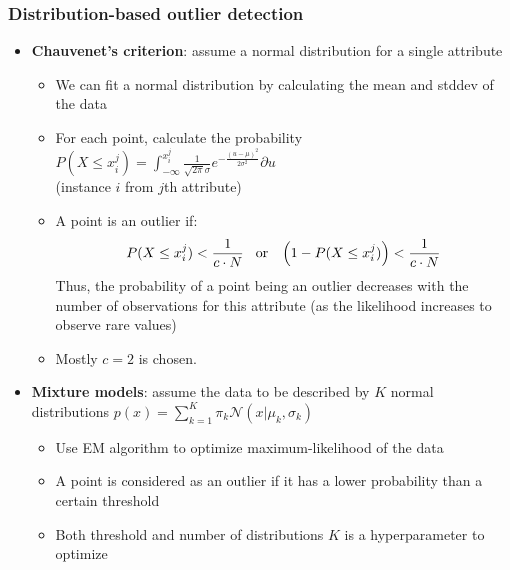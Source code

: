 \subsubsection{Distribution-based outlier detection}
\begin{itemize}
	\item \textbf{Chauvenet's criterion}: assume a normal distribution for a single attribute
	\begin{itemize}
		\item We can fit a normal distribution by calculating the mean and stddev of the data
		\item For each point, calculate the probability $P(X\leq x_{i}^{j})=\int_{-\infty}^{x_{i}^{j}} \frac{1}{\sqrt{2\pi}\sigma}e^{-\frac{(u-\mu)^2}{2\sigma^2}} \partial u$\\ (instance $i$ from $j$th attribute)
		\item A point is an outlier if:
		$$P(X\leq x_{i}^{j}) < \frac{1}{c\cdot N} \hspace{3mm}\text{or}\hspace{3mm} \left(1-P(X\leq x_{i}^{j})\right) < \frac{1}{c\cdot N}$$
		Thus, the probability of a point being an outlier decreases with the number of observations for this attribute (as the likelihood increases to observe rare values)
		\item Mostly $c=2$ is chosen.
	\end{itemize}
	\item \textbf{Mixture models}: assume the data to be described by $K$ normal distributions $p(x)=\sum_{k=1}^{K}\pi_k \mathcal{N}\left(x|\mu_k, \sigma_k\right)$
	\begin{itemize}
		\item Use EM algorithm to optimize maximum-likelihood of the data
		\item A point is considered as an outlier if it has a lower probability than a certain threshold
		\item Both threshold and number of distributions $K$ is a hyperparameter to optimize
	\end{itemize}
\end{itemize}
